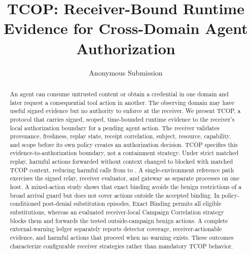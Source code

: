 \documentclass[letterpaper,twocolumn,10pt]{article}
\date{}
\title{\Large \bf TCOP: Receiver-Bound Runtime Evidence for Cross-Domain Agent Authorization}
\author{Anonymous Submission}
\begin{document}
\maketitle
\begin{abstract}
An agent can consume untrusted content or obtain a credential in one domain and later request a consequential tool action in another. The observing domain may have useful signed evidence but no authority to enforce at the receiver. We present TCOP, a protocol that carries signed, scoped, time-bounded runtime evidence to the receiver's local authorization boundary for a pending agent action. The receiver validates provenance, freshness, replay state, receipt correlation, subject, resource, capability, and scope before its own policy creates an authorization decision. TCOP specifies this evidence-to-authorization boundary, not a containment strategy. Under strict matched replay, \DeterministicActionsPrevented{} harmful actions forwarded without context changed to blocked with matched TCOP context, reducing harmful calls from \DeterministicBaselineHarmfulCalls{} to \DeterministicTreatmentHarmfulCalls{}. A single-environment reference path exercises the signed relay, receiver evaluator, and gateway as separate processes on one host. A mixed-action study shows that exact binding avoids the benign restrictions of a broad arrival guard but does not cover actions outside the accepted binding. In \AdaptiveStrictEpisodes{} policy-conditioned post-denial substitution episodes, Exact Binding permits all \AdaptiveCTwoPostDenialCompleted{} eligible substitutions, whereas an evaluated receiver-local Campaign Correlation strategy blocks them and forwards the tested outside-campaign benign actions. A complete external-warning ledger separately reports detector coverage, receiver-actionable evidence, and harmful actions that proceed when no warning exists. These outcomes characterize configurable receiver strategies rather than mandatory TCOP behavior.
\end{abstract}












\appendix







\end{document}
